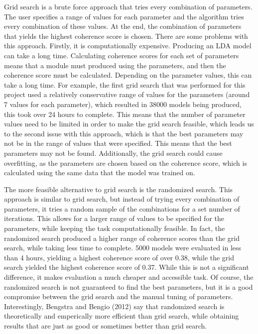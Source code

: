 Grid search is a brute force approach that tries every combination of parameters. The user specifies a range of values for each parameter and the algorithm tries every combination of these values. At the end, the combination of parameters that yields the highest coherence score is chosen. There are some problems with this approach. Firstly, it is computationally expensive. Producing an LDA model can take a long time. Calculating coherence scores for each set of parameters means that a module must produced using the parameters, and then the coherence score must be calculated. Depending on the parameter values, this can take a long time. For example, the first grid search that was performed for this project used a relatively conservative range of values for the parameters (around 7 values for each parameter), which resulted in 38000 models being produced, this took over 24 hours to complete. This means that the number of parameter values need to be limited in order to make the grid search feasible, which leads us to the second issue with this approach, which is that the best parameters may not be in the range of values that were specified. This means that the best parameters may not be found. Additionally, the grid search could cause overfitting, as the parameters are chosen based on the coherence score, which is calculated using the same data that the model was trained on.

The more feasible alternative to grid search is the randomized search. This approach is similar to grid search, but instead of trying every combination of parameters, it tries a random sample of the combinations for a set number of iterations. This allows for a larger range of values to be specified for the parameters, while keeping the task computationally feasible. In fact, the randomized search produced a higher range of coherence scores than the grid search, while taking less time to complete. 5000 models were evaluated in less than 4 hours, yielding a highest coherence score of over 0.38, while the grid search yielded the highest coherence score of 0.37. While this is not a significant difference, it makes evaluation a much cheaper and accessible task. Of course, the randomized search is not guaranteed to find the best parameters, but it is a good compromise between the grid search and the manual tuning of parameters. Interestingly, Bengstra and Bengio (2012) say that randomized search is theoretically and emperically more efficient than grid search, while obtaining results that are just as good or sometimes better than grid search.~\cite{bergstra2012random}


